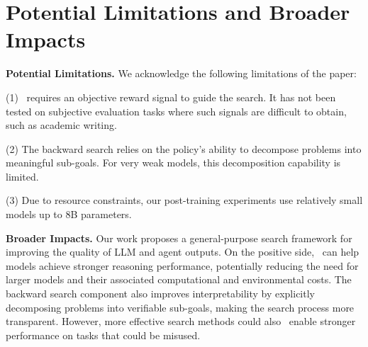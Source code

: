 \section{Potential Limitations and Broader Impacts}

\label{app:lim}

\textbf{Potential Limitations.} We acknowledge the following limitations of the paper:

(1) \ours\ requires an objective reward signal to guide the search. It has not been tested on subjective evaluation tasks where such signals are difficult to obtain, such as academic writing.

(2) The backward search relies on the policy's ability to decompose problems into meaningful sub-goals. For very weak models, this decomposition capability is limited. 

(3) Due to resource constraints, our post-training experiments use relatively small models up to 8B parameters.

 

\textbf{Broader Impacts.} Our work proposes a general-purpose search framework for improving the quality of LLM and agent outputs. On the positive side, \ours\ can help models achieve stronger reasoning performance, potentially reducing the need for larger models and their associated computational and environmental costs. The backward search component also improves interpretability by explicitly decomposing problems into verifiable sub-goals, making the search process more transparent. However, more effective search methods could also  enable stronger performance on tasks that could be misused. 
